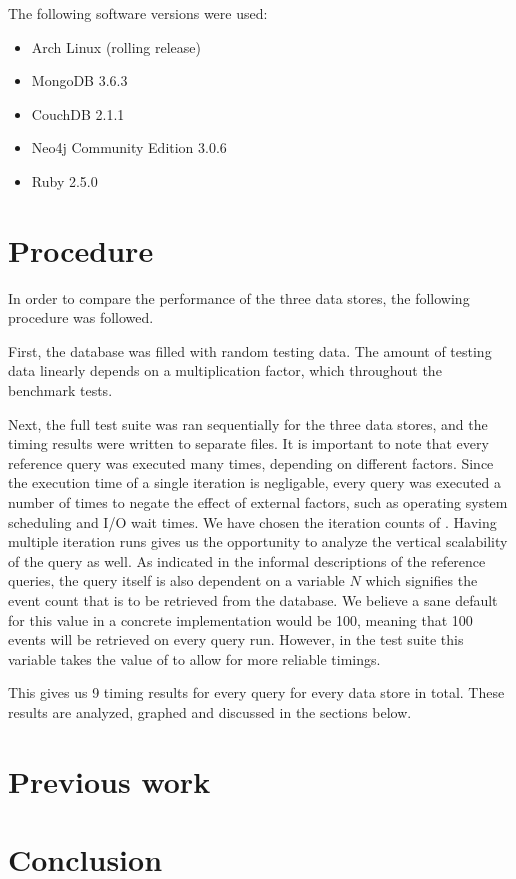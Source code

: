 The following software versions were used:

\begin{itemize}
  \item Arch Linux (rolling release)
  \item MongoDB 3.6.3
  \item CouchDB 2.1.1
  \item Neo4j Community Edition 3.0.6
  \item Ruby 2.5.0
\end{itemize}

\section{Procedure}
\label{sec:procedure}

In order to compare the performance of the three data stores, the following procedure was followed.

First, the database was filled with random testing data.
The amount of testing data linearly depends on a multiplication factor, which  throughout the benchmark tests.

Next, the full test suite was ran sequentially for the three data stores, and the timing results were written to separate files.
It is important to note that every reference query was executed many times, depending on different factors.
Since the execution time of a single iteration is negligable, every query was executed a number of times to negate the effect of external factors, such as operating system scheduling and I/O wait times.
We have chosen the iteration counts of .
Having multiple iteration runs gives us the opportunity to analyze the vertical scalability of the query as well.
As indicated in the informal descriptions of the reference queries, the query itself is also dependent on a variable $N$ which signifies the event count that is to be retrieved from the database.
We believe a sane default for this value in a concrete implementation would be 100, meaning that 100 events will be retrieved on every query run.
However, in the test suite this variable takes the value of  to allow for more reliable timings.

This gives us 9 timing results for every query for every data store in total.
These results are analyzed, graphed and discussed in the sections below.

\section{Previous work}
\label{sec:previous-work}


\section{Conclusion}
\label{sec:comparative-study-conclusion}
